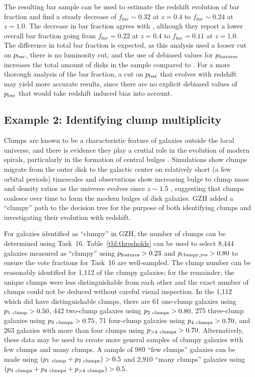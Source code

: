 \documentclass[twocolumn]{aastex6}
\begin{document}
The resulting bar sample can be used to estimate the redshift evolution of bar fraction and find a steady decrease of $f_{bar} \sim 0.32$ at $z=0.4$ to $f_{bar} \sim 0.24$ at $z=1.0$. The decrease in bar fraction agrees with \citet{mel14}, although they report a lower overall bar fraction going from $f_{bar}=0.22$ at $z=0.4$ to $f_{bar}=0.11$ at $z=1.0$. The difference in total bar fraction is expected, as this analysis used a looser cut on $p_{\rm bar}$, there is no luminosity cut, and the use of debiased values for $p_{\rm features}$ increases the total amount of disks in the sample compared to \citet{mel14}. For a more thorough analysis of the bar fraction, a cut on $p_{\rm bar}$ that evolves with redshift may yield more accurate results, since there are no explicit debiased values of $p_{\rm bar}$ that would take redshift induced bias into account. 

\subsection{Example 2: Identifying clump multiplicity}
Clumps are known to be a characteristic feature of galaxies outside the local universe, and there is evidence they play a crutial role in the evolution of modern spirals, particularly in the formation of central bulges \citep{elm05,elm14,guo15,beh16}. Simulations show clumps migrate from the outer disk to the galactic center on relatively short (a few orbital periods) timescales \citep{man15} and observations show increasing bulge to clump mass and density ratios as the universe evolves since $z\sim 1.5$ \citep{elm09}, suggesting that clumps coalesce over time to form the modern bulges of disk galaxies. GZH added a ``clumpy'' path to the decision tree for the purpose of both identifying clumps and investigating their evolution with redshift. 

For galaxies identified as ``clumpy'' in GZH, the number of clumps can be determined using Task~16. Table~\ref{tbl:thresholds} can be used to select 8,444 galaxies measured as ``clumpy'' using $p_{\rm features} > 0.23$ and $p_{\rm clumpy,yes}>0.80$ to ensure the vote fractions for Task~16 are well-sampled. The clump number can be reasonably identified for 1,112 of the clumpy galaxies; for the remainder, the unique clumps were less distinguishable from each other and the exact number of clumps could not be deduced without careful visual inspection. In the 1,112 which did have distinguishable clumps, there are 61 one-clump galaxies using $p_{\rm 1~clump}>0.50$, 442 two-clump galaxies using $p_{\rm 2~clumps}>0.80$, 275 three-clump galaxies using $p_{\rm 3~clumps}>0.75$, 71 four-clump galaxies using $p_{\rm 4~clumps} > 0.70$, and 263 galaxies with more than four clumps using $p_{\rm >4~clumps}>0.70$. Alternatively, these data may be used to create more general samples of clumpy galaxies with few clumps and many clumps. A sample of 989 ``few clumps'' galaxies can be made using $(p_{\rm 1~clump} + p_{\rm 2~clumps}) > 0.5$ and 2,910 ``many clumps'' galaxies using $(p_{\rm 3~clumps}+p_{\rm 4~clumps}+p_{\rm >4~clumps})>0.5$.
\end{document}
